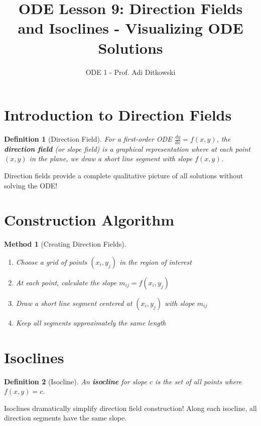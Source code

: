 \documentclass[12pt]{article}
\title{ODE Lesson 9: Direction Fields and Isoclines - Visualizing ODE Solutions}
\author{ODE 1 - Prof. Adi Ditkowski}
\date{}
\newtheorem{definition}{Definition}
\newtheorem{method}{Method}
\begin{document}
\maketitle

\section{Introduction to Direction Fields}

\begin{definition}[Direction Field]
For a first-order ODE $\frac{dy}{dx} = f(x,y)$, the \textbf{direction field} (or slope field) is a graphical representation where at each point $(x,y)$ in the plane, we draw a short line segment with slope $f(x,y)$.
\end{definition}

\begin{keypoint}
Direction fields provide a complete qualitative picture of all solutions without solving the ODE!
\end{keypoint}

\section{Construction Algorithm}

\begin{method}[Creating Direction Fields]
\begin{enumerate}
    \item Choose a grid of points $(x_i, y_j)$ in the region of interest
    \item At each point, calculate the slope $m_{ij} = f(x_i, y_j)$
    \item Draw a short line segment centered at $(x_i, y_j)$ with slope $m_{ij}$
    \item Keep all segments approximately the same length
\end{enumerate}
\end{method}

\section{Isoclines}

\begin{definition}[Isocline]
An \textbf{isocline} for slope $c$ is the set of all points where $f(x,y) = c$.
\end{definition}

\begin{insight}
Isoclines dramatically simplify direction field construction! Along each isocline, all direction segments have the same slope.
\end{insight}
\end{document}
